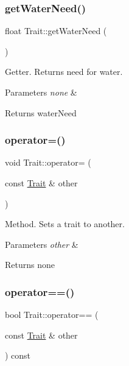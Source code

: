 \subsubsection{\texorpdfstring{get\+Water\+Need()}{getWaterNeed()}}
{\footnotesize\ttfamily float Trait\+::get\+Water\+Need (\begin{DoxyParamCaption}{ }\end{DoxyParamCaption})}

Getter. Returns need for water. 
\begin{DoxyParams}{Parameters}
{\em none} & \\
\hline
\end{DoxyParams}
\begin{DoxyReturn}{Returns}
water\+Need 
\end{DoxyReturn}
\mbox{\label{class_trait_a88a21860c203813df4ecdcfe37758f88}} 
\subsubsection{\texorpdfstring{operator=()}{operator=()}}
{\footnotesize\ttfamily void Trait\+::operator= (\begin{DoxyParamCaption}\item[{const \hyperlink{class_trait}{Trait} \&}]{other }\end{DoxyParamCaption})}

Method. Sets a trait to another. 
\begin{DoxyParams}{Parameters}
{\em other} & \\
\hline
\end{DoxyParams}
\begin{DoxyReturn}{Returns}
none 
\end{DoxyReturn}
\mbox{\label{class_trait_a04b0daee14f5cfd70e7e5ac485ce87ec}} 
\subsubsection{\texorpdfstring{operator==()}{operator==()}}
{\footnotesize\ttfamily bool Trait\+::operator== (\begin{DoxyParamCaption}\item[{const \hyperlink{class_trait}{Trait} \&}]{other }\end{DoxyParamCaption}) const}

